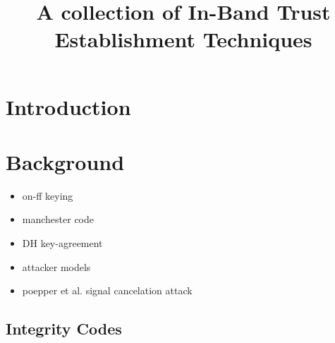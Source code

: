 \documentclass[conference]{IEEEtran}
\begin{document}
\title{A collection of In-Band Trust Establishment Techniques\\
}

\author{
}

\maketitle

\begin{abstract}

\end{abstract}


\section{Introduction}

\section{Background}
\begin{itemize}
    \item on-ff keying
    \item manchester code 
    \item DH key-agreement
    \item attacker models
    \item poepper et al. signal cancelation attack
\end{itemize}

\subsection{Integrity Codes}
\end{document}
